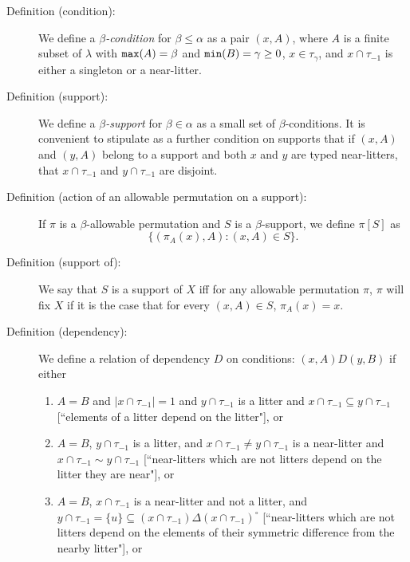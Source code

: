 \documentclass[112pt]{article}
\begin{document}
\begin{description}

\item[Definition (condition):]  We define a {\em $\beta$-condition\/} for $\beta\leq \alpha$ as a pair $(x,A)$, where $A$ is a finite subset of $\lambda$ with ${\tt max}(A)=\beta$ and ${\tt min}(B) = \gamma \geq 0$, $x \in \tau_\gamma$, and $x \cap \tau_{-1}$ is either a singleton or a near-litter.

\item[Definition (support):]  We define a {\em $\beta$-support\/} for $\beta\in \alpha$ as a small set of $\beta$-conditions.  It is convenient to stipulate
as a further condition on supports that if $(x,A)$ and $(y,A)$ belong to a support and both $x$ and $y$ are typed near-litters, that $x \cap \tau_{-1}$ and $y \cap \tau_{-1}$ are disjoint.

\item[Definition (action of an allowable permutation on a support):]  If $\pi$ is a $\beta$-allowable permutation and $S$ is a $\beta$-support,
we define $\pi[S]$ as $$\{(\pi_A(x),A):(x,A) \in S\}.$$

\item[Definition (support of):]  We say that $S$ is a support of $X$ 
iff for any allowable permutation $\pi$, $\pi$ will fix $X$ if it is the case that for every $(x,A)\in S$, $\pi_A(x)=x$.

\item[Definition (dependency):]  We define a relation of dependency $D$ on conditions:  $(x,A)D(y,B)$  if either 

\begin{enumerate}
\item $A=B$ and $|x \cap \tau_{-1}|=1$ and $y \cap \tau_{-1}$ is a litter and $x \cap \tau_{-1} \subseteq y \cap \tau_{-1}$ [``elements of a litter depend on the litter"], or 

\item $A=B$, $y \cap \tau_{-1}$ is a litter, and $x \cap \tau_{-1} \neq y \cap \tau_{-1}$ is a near-litter and $x \cap \tau_{-1} \sim y \cap \tau_{-1}$ [``near-litters which are not litters depend on the litter they are near"], or 

\item $A=B$, $x \cap \tau_{-1}$ is a near-litter and not a litter, and $y \cap \tau_{-1} = \{u\} \subseteq (x \cap \tau_{-1}) \Delta (x \cap \tau_{-1})^\circ$ [``near-litters which are not litters depend on the elements of their symmetric difference from the nearby litter"], or


\end{enumerate}
\end{description}
\end{document}
